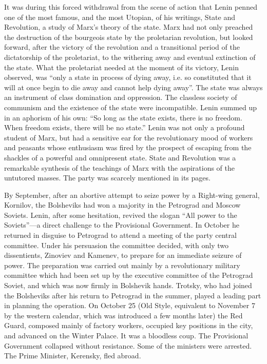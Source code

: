 It was during this forced withdrawal from the scene of action that Lenin penned one of the most famous, and the most Utopian, of his writings, State and Revolution, a study of Marx's theory of the state. Marx had not only preached the destruction of the bourgeois state by the proletarian revolution, but looked forward, after the victory of the revolution and a transitional period of the dictatorship of the proletariat, to the withering away and eventual extinction of the state. What the proletariat needed at the moment of its victory, Lenin observed, was ``only a state in process of dying away, i.e. so constituted that it will at once begin to die away and cannot help dying away''. The state was always an instrument of class domination and oppression. The classless society of communism and the existence of the state were incompatible. Lenin summed up in an aphorism of his own: ``So long as the state exists, there is no freedom. When freedom exists, there will be no state.'' Lenin was not only a profound student of Marx, but had a sensitive ear for the revolutionary mood of workers and peasants whose enthusiasm was fired by the prospect of escaping from the shackles of a powerful and omnipresent state. State and Revolution was a remarkable synthesis of the teachings of Marx with the aspirations of the untutored masses. The party was scarcely mentioned in its pages. 

By September, after an abortive attempt to seize power by a Right-wing general, Kornilov, the Bolsheviks had won a majority in the Petrograd and Moscow Soviets. Lenin, after some hesitation, revived the slogan ``All power to the Soviets''---a direct challenge to the Provisional Government. In October he returned in disguise to Petrograd to attend a meeting of the party central committee. Under his persuasion the committee decided, with only two dissentients, Zinoviev and Kamenev, to prepare for an immediate seizure of power. The preparation was carried out mainly by a revolutionary military committee which had been set up by the executive committee of the Petrograd Soviet, and which was now firmly in Bolshevik hands. Trotsky, who had joined the Bolsheviks after his return to Petrograd in the summer, played a leading part in planning the operation. On October 25 (Old Style, equivalent to November 7 by the western calendar, which was introduced a few months later) the Red Guard, composed mainly of factory workers, occupied key positions in the city, and advanced on the Winter Palace. It was a bloodless coup. The Provisional Government collapsed without resistance. Some of the ministers were arrested. The Prime Minister, Kerensky, fled abroad. 


